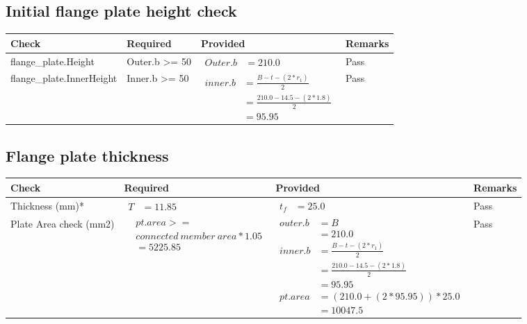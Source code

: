 \documentclass{article}%
\begin{document}
%
\newpage%
\subsection{Initial flange plate height check}%
\label{subsec:Initialflangeplateheightcheck}%
\renewcommand{\arraystretch}{1.2}%
\begin{longtable}{|p{4.5cm}|p{2.5cm}|p{7cm}|p{1.5cm}|}%
\hline%
\rowcolor{OsdagGreen}%
Check&Required&Provided&Remarks\\%
\hline%
\endhead%
\hline%
flange\_plate.Height&Outer.b >= 50&$\begin{aligned} Outer.b &=210.0\end{aligned}$&Pass\\%
\hline%
flange\_plate.InnerHeight&Inner.b >= 50&$\begin{aligned} inner.b &= \frac{B-t-(2*r_1)}{2}\\ &=\frac{210.0-14.5-(2*1.8)}{2}\\ &= 95.95\end{aligned}$&Pass\\%
\hline%
\end{longtable}

%
\newpage%
\subsection{Flange plate thickness}%
\label{subsec:Flangeplatethickness}%
\renewcommand{\arraystretch}{1.2}%
\begin{longtable}{|p{2.5cm}|p{4.5cm}|p{7cm}|p{1.5cm}|}%
\hline%
\rowcolor{OsdagGreen}%
Check&Required&Provided&Remarks\\%
\hline%
\endhead%
\hline%
Thickness (mm)*&$\begin{aligned} T &=11.85\end{aligned}$&$\begin{aligned} t_f &=25.0\end{aligned}$&Pass\\%
\hline%
Plate Area check (mm2)&$\begin{aligned} &pt.area >= \\&connected~member~area * 1.05\\  &= 5225.85\end{aligned}$&$\begin{aligned} outer.b &= B\\ &= 210.0 \\ inner.b &= \frac{B-t-(2*r_1)}{2}\\ &=\frac{210.0-14.5-(2*1.8)}{2}\\ &= 95.95 \\  pt.area &=(210.0+(2*95.95))*25.0\\ &= 10047.5\end{aligned}$&Pass\\%
\hline%
\end{longtable}
\end{document}
